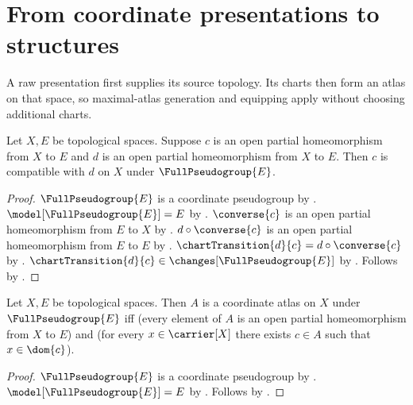 \section{From coordinate presentations to structures}




A raw presentation first supplies its source topology. Its charts then form
an atlas on that space, so maximal-atlas generation and equipping apply without
choosing additional charts.

\begin{theorem}\label{full_pseudogroup_chart_compatibility}
    Let $X,E$ be topological spaces.
    Suppose $c$ is an open partial homeomorphism from $X$ to $E$ and
        $d$ is an open partial homeomorphism from $X$ to $E$.
    Then $c$ is compatible with $d$ on $X$ under $\FullPseudogroup{E}$.
\end{theorem}
\begin{proof}
    $\FullPseudogroup{E}$ is a coordinate pseudogroup by .
    $\model[\FullPseudogroup{E}]=E$ by .
    $\converse{c}$ is an open partial homeomorphism from $E$ to $X$ by
        .
    $d\circ\converse{c}$ is an open partial homeomorphism from $E$ to $E$ by
        .
    $\chartTransition{d}{c}=d\circ\converse{c}$ by .
    $\chartTransition{d}{c}\in\changes[\FullPseudogroup{E}]$ by
        .
    Follows by .
\end{proof}

\begin{theorem}\label{full_pseudogroup_atlas_iff}
    Let $X,E$ be topological spaces.
    Then $A$ is a coordinate atlas on $X$ under $\FullPseudogroup{E}$ iff
        (every element of $A$ is an open partial homeomorphism from $X$ to $E$) and
        (for every $x\in\carrier[X]$ there exists $c\in A$ such that $x\in\dom{c}$).
\end{theorem}
\begin{proof}
    $\FullPseudogroup{E}$ is a coordinate pseudogroup by .
    $\model[\FullPseudogroup{E}]=E$ by .
    Follows by .
\end{proof}

